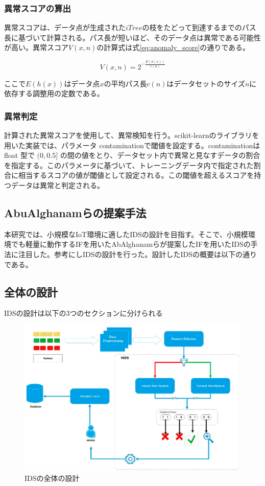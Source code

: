\documentclass{css}
\begin{document}
\subsubsection{異常スコアの算出}

異常スコアは、データ点が生成された$iTree$の枝をたどって到達するまでのパス長に基づいて計算される。パス長が短いほど、そのデータ点は異常である可能性が高い。異常スコア$V(x,n)$の計算式は式\ref{eq:anomaly_score}の通りである。


\begin{equation}
    V(x, n) = 2^{-\frac{E(h(x))}{c(n)}}
    \label{eq:anomaly_score}
\end{equation}

ここで$E(h(x))$はデータ点$x$の平均パス長$c(n)$はデータセットのサイズ$n$に依存する調整用の定数である。

\subsubsection{異常判定}
計算された異常スコアを使用して、異常検知を行う。scikit-learnのライブラリを用いた実装では、パラメータ contaminationで閾値を設定する。contaminationは float 型で $(0, 0.5]$ の間の値をとり、データセット内で異常と見なすデータの割合を指定する。このパラメータに基づいて、トレーニングデータ内で指定された割合に相当するスコアの値が閾値として設定される。この閾値を超えるスコアを持つデータは異常と判定される。


\subsection{AbuAlghanamらの提案手法}
本研究では、小規模なIoT環境に適したIDSの設計を目指す。そこで、小規模環境でも軽量に動作するIFを用いたAbAlghanamらが提案したIFを用いたIDSの手法\cite{AbuAlghanam2023-sx}に注目した。参考にしIDSの設計を行った。設計したIDSの概要は以下の通りである。

\subsection{全体の設計}
IDSの設計は以下の3つのセクションに分けられる

\begin{figure}
    \centering
    \includegraphics[width=\linewidth]{pictures/eps/system.eps}
    \caption{IDSの全体の設計}
    \label{fig:IDS}
\end{figure}
\end{document}
